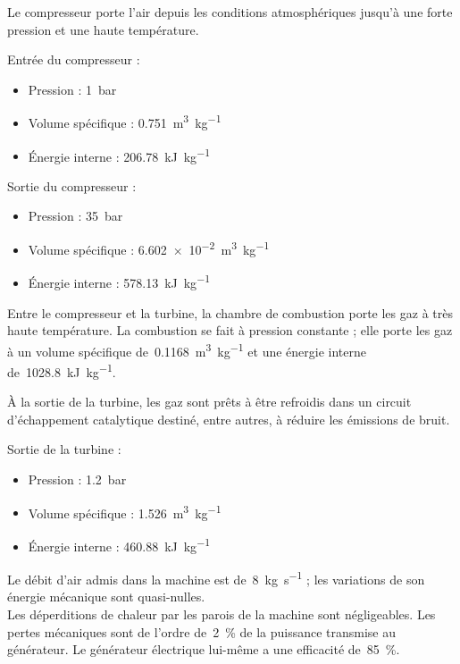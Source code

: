 	Le compresseur porte l’air depuis les conditions atmosphériques jusqu’à une forte pression et une haute température.
	
	Entrée du compresseur :
		
	\begin{itemize}
		\item Pression : 				\tab \SI{1}{\bar}
		\item Volume spécifique : 	\tab \SI{0,751}{\metre\cubed\per\kilogram}
		\item Énergie interne : 	\tab \SI{206,78}{\kilo\joule\per\kilogram}
	\end{itemize}

	Sortie du compresseur :
		
	\begin{itemize}
		\item Pression : 				\tab \SI{35}{\bar}
		\item Volume spécifique : 	\tab \SI{6,602e-2}{\metre\cubed\per\kilogram}
		\item Énergie interne : 	\tab \SI{578,13}{\kilo\joule\per\kilogram}
	\end{itemize}

	Entre le compresseur et la turbine, la chambre de combustion porte les gaz à très haute température. La combustion se fait à pression constante ; elle porte les gaz à un volume spécifique de~\SI{0,1168}{\metre\cubed\per\kilogram} et une énergie interne de~\SI{1028,8}{\kilo\joule\per\kilogram}. 
	
	À la sortie de la turbine, les gaz sont prêts à être refroidis dans un circuit d’échappement catalytique destiné, entre autres, à réduire les émissions de bruit.
	
	Sortie de la turbine :
		
	\begin{itemize}
		\item Pression : 				\tab \SI{1,2}{\bar}
		\item Volume spécifique : 	\tab \SI{1,526}{\metre\cubed\per\kilogram}
		\item Énergie interne : 	\tab \SI{460,88}{\kilo\joule\per\kilogram}
	\end{itemize}

	Le débit d’air admis dans la machine est de~\SI{8}{\kilogram\per\second} ; les variations de son énergie mécanique sont quasi-nulles.\\
	Les déperditions de chaleur par les parois de la machine sont négligeables. Les pertes mécaniques sont de l’ordre de~\SI{2}{\percent} de la puissance transmise au générateur. Le générateur électrique lui-même a une efficacité de~\SI{85}{\percent}.

